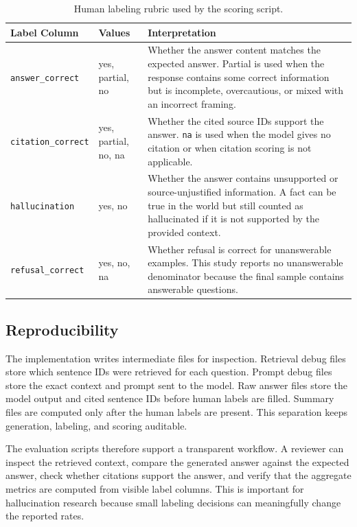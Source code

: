 \documentclass[10pt,twocolumn]{article}
\begin{document}
\begin{table}[t]
\centering
\small
\begin{tabular}{p{}p{}p{}}
\toprule
\textbf{Label Column} & \textbf{Values} & \textbf{Interpretation} \\
\midrule
\texttt{answer\_correct} & yes, partial, no & Whether the answer content matches the expected answer. Partial is used when the response contains some correct information but is incomplete, overcautious, or mixed with an incorrect framing. \\
\texttt{citation\_correct} & yes, partial, no, na & Whether the cited source IDs support the answer. \texttt{na} is used when the model gives no citation or when citation scoring is not applicable. \\
\texttt{hallucination} & yes, no & Whether the answer contains unsupported or source-unjustified information. A fact can be true in the world but still counted as hallucinated if it is not supported by the provided context. \\
\texttt{refusal\_correct} & yes, no, na & Whether refusal is correct for unanswerable examples. This study reports no unanswerable denominator because the final sample contains answerable questions. \\
\bottomrule
\end{tabular}
\caption{Human labeling rubric used by the scoring script.}
\label{tab:label-rubric}
\end{table}

\subsection{Reproducibility}

The implementation writes intermediate files for inspection. Retrieval debug files store which sentence IDs were retrieved for each question. Prompt debug files store the exact context and prompt sent to the model. Raw answer files store the model output and cited sentence IDs before human labels are filled. Summary files are computed only after the human labels are present. This separation keeps generation, labeling, and scoring auditable.

The evaluation scripts therefore support a transparent workflow. A reviewer can inspect the retrieved context, compare the generated answer against the expected answer, check whether citations support the answer, and verify that the aggregate metrics are computed from visible label columns. This is important for hallucination research because small labeling decisions can meaningfully change the reported rates.
\end{document}
